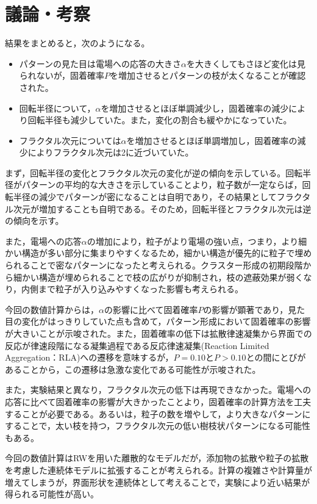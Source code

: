 \documentclass[autodetect-engine,dvi=dvipdfmx,a4paper,ja=standard,oneside,openany,11pt,draft]{bxjsbook}
\begin{document}
\section{議論・考察}
結果をまとめると，次のようになる。
\begin{itemize}
  \item パターンの見た目は電場への応答の大きさ$\alpha$を大きくしてもさほど変化は見られないが，固着確率$P$を増加させるとパターンの枝が太くなることが確認された。
  \item 回転半径について，$\alpha$を増加させるとほぼ単調減少し，固着確率の減少により回転半径も減少していた。また，変化の割合も緩やかになっていた。
  \item フラクタル次元については$\alpha$を増加させるとほぼ単調増加し，固着確率の減少によりフラクタル次元は2に近づいていた。
\end{itemize}

まず，回転半径の変化とフラクタル次元の変化が逆の傾向を示している。回転半径がパターンの平均的な大きさを示していることより，粒子数が一定ならば，回転半径の減少でパターンが密になることは自明であり，その結果としてフラクタル次元が増加することも自明である。そのため，回転半径とフラクタル次元は逆の傾向を示す。

また，電場への応答$\alpha$の増加により，粒子がより電場の強い点，つまり，より細かい構造が多い部分に集まりやすくなるため，細かい構造が優先的に粒子で埋められることで密なパターンになったと考えられる。クラスター形成の初期段階から細かい構造が埋められることで枝の広がりが抑制され，枝の遮蔽効果が弱くなり，内側まで粒子が入り込みやすくなった影響も考えられる。

今回の数値計算からは，$\alpha$の影響に比べて固着確率$P$の影響が顕著であり，見た目の変化がはっきりしていた点も含めて，パターン形成において固着確率の影響が大きいことが示唆された。また，固着確率の低下は拡散律速凝集から界面での反応が律速段階になる凝集過程である反応律速凝集(Reaction Limited Aggregation：RLA)への遷移を意味するが，$P=0.10$と$P>0.10$との間にとびがあることから，この遷移は急激な変化である可能性が示唆された。

また，実験結果と異なり，フラクタル次元の低下は再現できなかった。電場への応答に比べて固着確率の影響が大きかったことより，固着確率の計算方法を工夫することが必要である。あるいは，粒子の数を増やして，より大きなパターンにすることで，太い枝を持つ，フラクタル次元の低い樹枝状パターンになる可能性もある。

今回の数値計算はRWを用いた離散的なモデルだが，添加物の拡散や粒子の拡散を考慮した連続体モデルに拡張することが考えられる。計算の複雑さや計算量が増えてしまうが，界面形状を連続体として考えることで，実験により近い結果が得られる可能性が高い。

\ifdraft{
  
  
}{}
\end{document}

